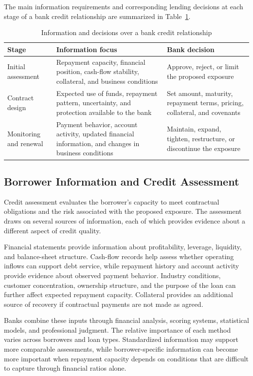 The main information requirements and corresponding
lending decisions at each stage of a bank credit
relationship are summarized in
Table~\ref{tab:ch12-credit-process}.

\begin{table}[H]
\centering
\caption{Information and decisions over a bank credit relationship}
\label{tab:ch12-credit-process}
\begin{tabularx}{0.90\textwidth}{@{}p{} X X@{}}
\toprule
\textbf{Stage} & \textbf{Information focus} & \textbf{Bank decision} \\
\midrule
Initial assessment
& Repayment capacity, financial position, cash-flow stability, collateral, and business conditions
& Approve, reject, or limit the proposed exposure \\
Contract design
& Expected use of funds, repayment pattern, uncertainty, and protection available to the bank
& Set amount, maturity, repayment terms, pricing, collateral, and covenants \\
Monitoring and renewal
& Payment behavior, account activity, updated financial information, and changes in business conditions
& Maintain, expand, tighten, restructure, or discontinue the exposure \\
\bottomrule
\end{tabularx}
\end{table}

\subsection{Borrower Information and Credit Assessment}

Credit assessment evaluates the borrower's capacity to meet contractual obligations and the risk associated with the proposed exposure. The assessment draws on several sources of information, each of which provides evidence about a different aspect of credit quality.

Financial statements provide information about profitability, leverage, liquidity, and balance-sheet structure. Cash-flow records help assess whether operating inflows can support debt service, while repayment history and account activity provide evidence about observed payment behavior. Industry conditions, customer concentration, ownership structure, and the purpose of the loan can further affect expected repayment capacity. Collateral provides an additional source of recovery if contractual payments are not made as agreed.

Banks combine these inputs through financial analysis, scoring systems, statistical models, and professional judgment. The relative importance of each method varies across borrowers and loan types. Standardized information may support more comparable assessments, while borrower-specific information can become more important when repayment capacity depends on conditions that are difficult to capture through financial ratios alone.

